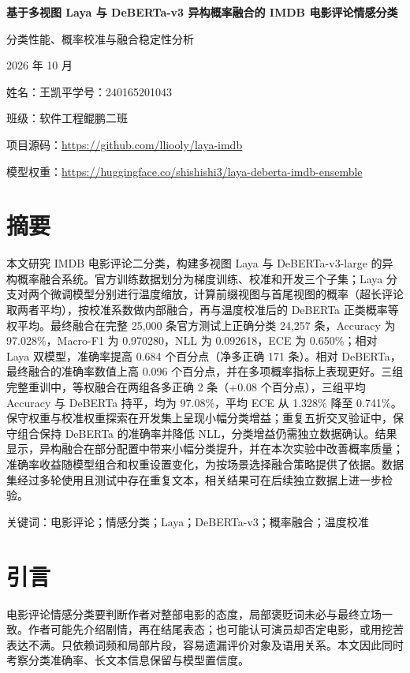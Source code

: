 \documentclass[UTF8,fontset=fandol,a4paper,11pt]{ctexart}
\begin{document}
\begin{center}
{\LARGE\bfseries 基于多视图 Laya 与 DeBERTa-v3 异构概率融合的 IMDB 电影评论情感分类}\par
\vspace{7pt}
{\normalsize 分类性能、概率校准与融合稳定性分析}\par
\vspace{5pt}
{\small 2026 年 10 月}\par
\vspace{5pt}
{\small 姓名：王凯平\qquad 学号：240165201043}\par
{\small 班级：软件工程鲲鹏二班}\par
{\small 项目源码：\url{https://github.com/lliooly/laya-imdb}}\par
{\small 模型权重：\url{https://huggingface.co/shishishi3/laya-deberta-imdb-ensemble}}
\end{center}
\vspace{4pt}

\section*{摘要}
本文研究 IMDB 电影评论二分类，构建多视图 Laya 与 DeBERTa-v3-large 的异构概率融合系统。官方训练数据划分为梯度训练、校准和开发三个子集；Laya 分支对两个微调模型分别进行温度缩放，计算前缀视图与首尾视图的概率（超长评论取两者平均），按校准系数做内部融合，再与温度校准后的 DeBERTa 正类概率等权平均。最终融合在完整 25,000 条官方测试上正确分类 24,257 条，Accuracy 为 97.028\%，Macro-F1 为 0.970280，NLL 为 0.092618，ECE 为 0.650\%；相对 Laya 双模型，准确率提高 0.684 个百分点（净多正确 171 条）。相对 DeBERTa，最终融合的准确率数值上高 0.096 个百分点，并在多项概率指标上表现更好。三组完整重训中，等权融合在两组各多正确 2 条（+0.08 个百分点），三组平均 Accuracy 与 DeBERTa 持平，均为 97.08\%，平均 ECE 从 1.328\% 降至 0.741\%。保守权重与校准权重探索在开发集上呈现小幅分类增益；重复五折交叉验证中，保守组合保持 DeBERTa 的准确率并降低 NLL，分类增益仍需独立数据确认。结果显示，异构融合在部分配置中带来小幅分类提升，并在本次实验中改善概率质量；准确率收益随模型组合和权重设置变化，为按场景选择融合策略提供了依据。数据集经过多轮使用且测试中存在重复文本，相关结果可在后续独立数据上进一步检验。

关键词：电影评论；情感分类；Laya；DeBERTa-v3；概率融合；温度校准

\section{引言}
电影评论情感分类要判断作者对整部电影的态度，局部褒贬词未必与最终立场一致。作者可能先介绍剧情，再在结尾表态；也可能认可演员却否定电影，或用挖苦表达不满。只依赖词频和局部片段，容易遗漏评价对象及语用关系。本文因此同时考察分类准确率、长文本信息保留与模型置信度。
\end{document}
